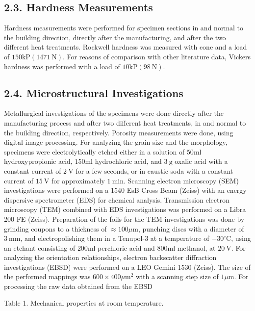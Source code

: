 \documentclass[10pt]{article}
\begin{document}
\subsection*{2.3. Hardness Measurements}
Hardness measurements were performed for specimen sections in and normal to the building direction, directly after the manufacturing, and after the two different heat treatments. Rockwell hardness was measured with cone and a load of $150 \mathrm{kP}(1471 \mathrm{~N})$. For reasons of comparison with other literature data, Vickers hardness was performed with a load of $10 \mathrm{kP}(98 \mathrm{~N})$.

\subsection*{2.4. Microstructural Investigations}
Metallurgical investigations of the specimens were done directly after the manufacturing process and after two different heat treatments, in and normal to the building direction, respectively. Porosity measurements were done, using digital image processing. For analyzing the grain size and the morphology, specimens were electrolytically etched either in a solution of $50 \mathrm{ml}$ hydroxypropionic acid, $150 \mathrm{ml}$ hydrochloric acid, and $3 \mathrm{~g}$ oxalic acid with a constant current of $2 \mathrm{~V}$ for a few seconds, or in caustic soda with a constant current of $15 \mathrm{~V}$ for approximately $1 \mathrm{~min}$. Scanning electron microscopy (SEM) investigations were performed on a 1540 EsB Cross Beam (Zeiss) with an energy dispersive spectrometer (EDS) for chemical analysis. Transmission electron microscopy (TEM) combined with EDS investigations was performed on a Libra 200 FE (Zeiss). Preparation of the foils for the TEM investigations was done by grinding coupons to a thickness of $\approx 100 \mu \mathrm{m}$, punching discs with a diameter of $3 \mathrm{~mm}$, and electropolishing them in a Tenupol-3 at a temperature of $-30^{\circ} \mathrm{C}$, using an etchant consisting of $200 \mathrm{ml}$ perchloric acid and $800 \mathrm{ml}$ methanol, at $20 \mathrm{~V}$. For analyzing the orientation relationships, electron backscatter diffraction investigations (EBSD) were performed on a LEO Gemini 1530 (Zeiss). The size of the performed mappings was $600 \times 400 \mu \mathrm{m}^{2}$ with a scanning step size of $1 \mu \mathrm{m}$. For processing the raw data obtained from the EBSD

Table 1. Mechanical properties at room temperature.
\end{document}
